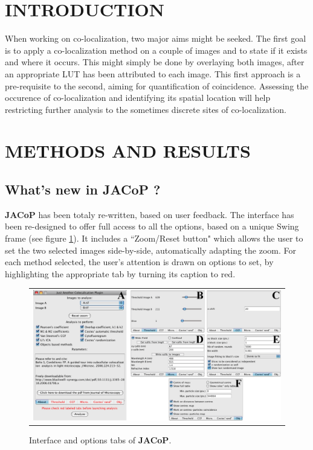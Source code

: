 \documentclass[]{spie}  %
\begin{document}
\section{INTRODUCTION}
\label{sec:intro} 
When working on co-localization, two major aims might be seeked. The first goal is to apply a co-localization method on a couple of images and to state if it exists and where it occurs. This might simply be done by overlaying both images, after an appropriate LUT has been attributed to each image. This first approach is a pre-requisite to the second, aiming for quantification of coincidence. Assessing the occurence of co-localization and identifying its spatial location will help restricting further analysis to the sometimes discrete sites of co-localization.
\section{METHODS AND RESULTS}
\label{sec:MM}
\subsection{What's new in JACoP ?}
\label{sec:New_JACoP}
\textbf{JACoP} has been totaly re-written, based on user feedback. The interface has been re-designed to offer full access to all the options, based on a unique Swing frame (see figure \ref{fig:interface}). It includes a ``Zoom/Reset button" which allows the user to set the two selected images side-by-side, automatically adapting the zoom. For each method selected, the user's attention is drawn on options to set, by highlighting the appropriate tab by turning its caption to red. 
\begin{figure}[!ht]
\begin{center}
\begin{tabular}{c}
\includegraphics[width=0.9\linewidth]{figs/interface.png}
\end{tabular}
\end{center}
\caption[interface] 
{\label{fig:interface} 
Interface and options tabs of \textbf{JACoP}.}
\end{figure} 
\end{document}
